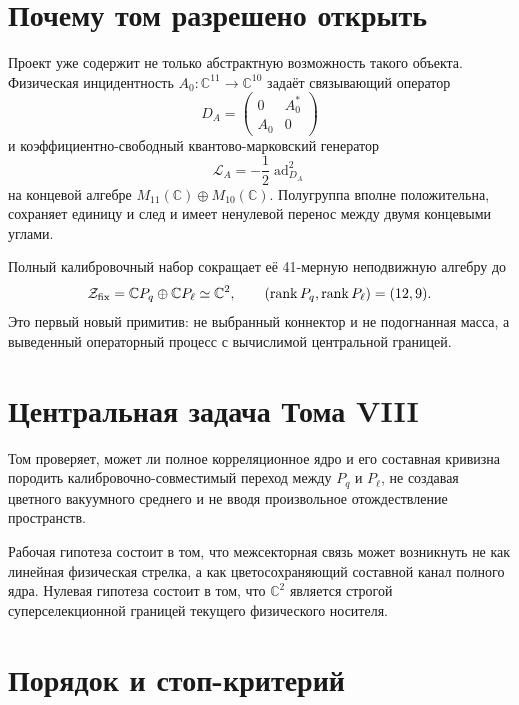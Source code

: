 \section{Почему том разрешено открыть}

Проект уже содержит не только абстрактную возможность такого объекта.
Физическая инцидентность $A_0:\mathbb C^{11}\to\mathbb C^{10}$ задаёт
связывающий оператор
\begin{equation}
 D_A=\begin{pmatrix}0&A_0^*\\A_0&0\end{pmatrix}
\end{equation}
и коэффициентно-свободный квантово-марковский генератор
\begin{equation}
 \mathcal L_A=-\frac12\operatorname{ad}_{D_A}^2
\end{equation}
на концевой алгебре $M_{11}(\mathbb C)\oplus M_{10}(\mathbb C)$.
Полугруппа вполне положительна, сохраняет единицу и след и имеет ненулевой
перенос между двумя концевыми углами.

Полный калибровочный набор сокращает её 41-мерную неподвижную алгебру до
\begin{equation}
 \mathcal Z_{\rm fix}
 =\mathbb CP_q\oplus\mathbb CP_\ell\simeq\mathbb C^2,
 \qquad (\operatorname{rank} P_q,\operatorname{rank} P_\ell)=(12,9).
\end{equation}
Это первый новый примитив: не выбранный коннектор и не подогнанная масса, а
выведенный операторный процесс с вычислимой центральной границей.

\section{Центральная задача Тома VIII}

Том проверяет, может ли полное корреляционное ядро и его составная
кривизна породить калибровочно-совместимый переход между $P_q$ и $P_\ell$, не
создавая цветного вакуумного среднего и не вводя произвольное
отождествление пространств.

Рабочая гипотеза состоит в том, что межсекторная связь может возникнуть не
как линейная физическая стрелка, а как цветосохраняющий составной канал
полного ядра. Нулевая гипотеза состоит в том, что $\mathbb C^2$ является
строгой суперселекционной границей текущего физического носителя.

\section{Порядок и стоп-критерий}


